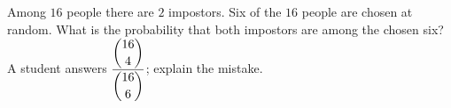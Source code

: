 Among $16$ people there are $2$ impostors. Six of the $16$ people are chosen at random. What is the probability that both impostors are among the chosen six? A student answers $\dfrac{\dbinom{16}{4}}{\dbinom{16}{6}}$; explain the mistake.
